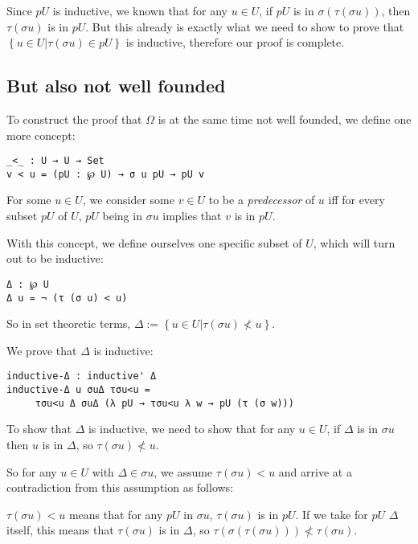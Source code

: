 \documentclass[runningheads]{llncs}
\begin{document}
Since $pU$ is inductive, we known that for any $u \in U$, if $pU$ is in $\sigma
(\tau (\sigma u))$, then $\tau (\sigma u)$ is in $pU$. But this already is
exactly what we need to show to prove that $\left \{ u \in U | \tau (\sigma u)
\in pU \right \}$ is inductive, therefore our proof is complete.

\subsection{But also not well founded}

To construct the proof that $\Omega$ is at the same time not well founded, we
define one more concept:

\begin{verbatim}
_<_ : U → U → Set
v < u = (pU : ℘ U) → σ u pU → pU v
\end{verbatim}

For some $u \in U$, we consider some $v \in U$ to be a \textit{predecessor} of
$u$ iff for every subset $pU$ of $U$, $pU$ being in $\sigma u$ implies that $v$
is in $pU$.

With this concept, we define ourselves one specific subset of $U$, which will
turn out to be inductive:

\begin{verbatim}
Δ : ℘ U
Δ u = ¬ (τ (σ u) < u)
\end{verbatim}

So in set theoretic terms, $\Delta := \left \{ u \in U | \tau (\sigma u) \nless
u \right \}$.

We prove that $\Delta$ is inductive:

\begin{verbatim}
inductive-Δ : inductive' Δ
inductive-Δ u σuΔ τσu<u =
     τσu<u Δ σuΔ (λ pU → τσu<u λ w → pU (τ (σ w)))
\end{verbatim}

To show that $\Delta$ is inductive, we need to show that for any $u \in U$, if
$\Delta$ is in $\sigma u$ then $u$ is in $\Delta$, so $\tau (\sigma u) \nless
u$.

So for any $u \in U$ with $\Delta \in \sigma u$, we assume $\tau (\sigma u) < u$
and arrive at a contradiction from this assumption as follows:

$\tau (\sigma u) < u$ means that for any $pU$ in $\sigma u$, $\tau (\sigma u)$
is in $pU$. If we take for $pU$ $\Delta$ itself, this means that $\tau (\sigma
u)$ is in $\Delta$, so $\tau (\sigma (\tau (\sigma u))) \nless \tau (\sigma u)$.
\end{document}

